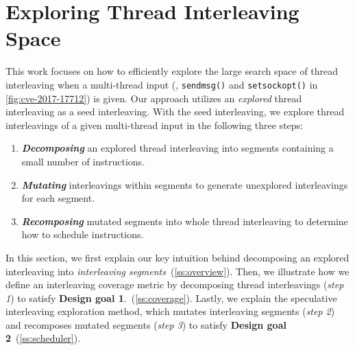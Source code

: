 \section{Exploring Thread Interleaving Space}
\label{s:design}

\newcommand{\intcov}{interleaving segment coverage\xspace}
\newcommand{\Intcov}{Interleaving segment coverage\xspace}




%

This work focuses on how to efficiently explore the large search space
of thread interleaving when a multi-thread input (\eg,
\texttt{sendmsg()} and \texttt{setsockopt()} in
\autoref{fig:cve-2017-17712}) is given. Our approach utilizes an
\textit{explored} thread interleaving as a seed interleaving.
%
With the seed interleaving, we explore thread interleavings of 
a given multi-thread input in the following three steps:
%
\begin{enumerate}[labelsep=0pt, label=\textbf{\arabic*) }]
\item \textbf{\textit{Decomposing}} an explored thread interleaving
  into segments containing a small number of instructions.
\item \textbf{\textit{Mutating}} interleavings within segments to
  generate unexplored interleavings for each segment.
\item \textbf{\textit{Recomposing}} mutated segments into whole thread
  interleaving to determine how to schedule instructions.
\end{enumerate}
%



In this section, we first explain our key intuition behind decomposing
an explored interleaving into \textit{interleaving
  segments}~(\autoref{ss:overview}).
%
Then, we illustrate how we define an interleaving coverage metric by
decomposing thread interleavings (\textit{step 1}) to satisfy
\textbf{Design goal 1}.~(\autoref{ss:coverage}).
%
%
Lastly, we explain the speculative interleaving exploration method,
which mutates interleaving segments (\textit{step 2}) and recomposes
mutated segments (\textit{step 3}) to satisfy \textbf{Design goal
  2}~(\autoref{ss:scheduler}).



